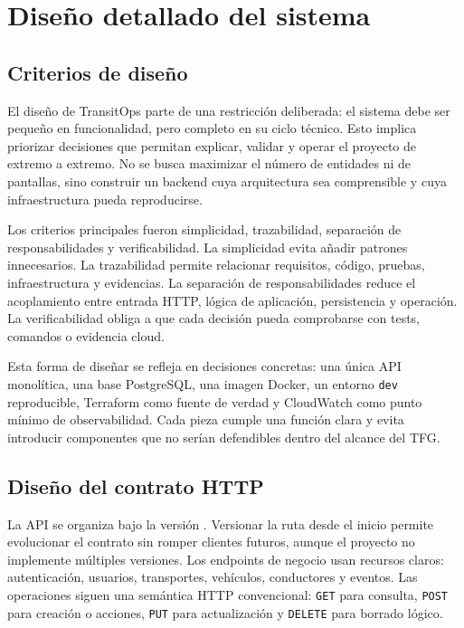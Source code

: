 \chapter{Diseño detallado del sistema}
\label{chap:diseno-detallado}

\section{Criterios de diseño}
\label{sec:criterios-diseno}

El diseño de TransitOps parte de una restricción deliberada: el sistema debe ser pequeño en funcionalidad, pero completo en su ciclo técnico. Esto implica priorizar decisiones que permitan explicar, validar y operar el proyecto de extremo a extremo. No se busca maximizar el número de entidades ni de pantallas, sino construir un backend cuya arquitectura sea comprensible y cuya infraestructura pueda reproducirse.

Los criterios principales fueron simplicidad, trazabilidad, separación de responsabilidades y verificabilidad. La simplicidad evita añadir patrones innecesarios. La trazabilidad permite relacionar requisitos, código, pruebas, infraestructura y evidencias. La separación de responsabilidades reduce el acoplamiento entre entrada HTTP, lógica de aplicación, persistencia y operación. La verificabilidad obliga a que cada decisión pueda comprobarse con tests, comandos o evidencia cloud.

Esta forma de diseñar se refleja en decisiones concretas: una única API monolítica, una base PostgreSQL, una imagen Docker, un entorno \texttt{dev} reproducible, Terraform como fuente de verdad y CloudWatch como punto mínimo de observabilidad. Cada pieza cumple una función clara y evita introducir componentes que no serían defendibles dentro del alcance del TFG.

\section{Diseño del contrato HTTP}
\label{sec:diseno-contrato-http}

La API se organiza bajo la versión . Versionar la ruta desde el inicio permite evolucionar el contrato sin romper clientes futuros, aunque el proyecto no implemente múltiples versiones. Los endpoints de negocio usan recursos claros: autenticación, usuarios, transportes, vehículos, conductores y eventos. Las operaciones siguen una semántica HTTP convencional: \texttt{GET} para consulta, \texttt{POST} para creación o acciones, \texttt{PUT} para actualización y \texttt{DELETE} para borrado lógico.

